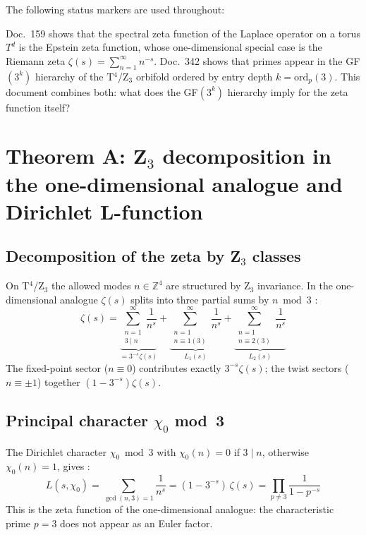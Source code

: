 The following status markers are used throughout:


Doc.~159 shows that the spectral zeta function of the Laplace operator on a torus
$T^d$ is the Epstein zeta function, whose one-dimensional special case is the
Riemann zeta $\zeta(s) = \sum_{n=1}^\infty n^{-s}$.
Doc.~342 shows that primes appear in the GF$(3^k)$ hierarchy of the T$^4$/Z$_3$
orbifold ordered by entry depth $k = \mathrm{ord}_p(3)$.
This document combines both: what does the GF$(3^k)$ hierarchy imply for the
zeta function itself?

\section{Theorem A: Z$_3$ decomposition in the one-dimensional analogue and Dirichlet L-function}

\subsection{Decomposition of the zeta by Z$_3$ classes}

On T$^4$/Z$_3$ the allowed modes $n \in \mathbb{Z}^4$ are structured by
Z$_3$ invariance. In the one-dimensional analogue $\zeta(s)$ splits into
three partial sums by $n \bmod 3$ \BM:
\begin{equation}
  \zeta(s) = \underbrace{\sum_{\substack{n=1\\3\mid n}}^\infty \frac{1}{n^s}}_{= 3^{-s}\zeta(s)}
  + \underbrace{\sum_{\substack{n=1\\n\equiv 1(3)}}^\infty \frac{1}{n^s}}_{L_1(s)}
  + \underbrace{\sum_{\substack{n=1\\n\equiv 2(3)}}^\infty \frac{1}{n^s}}_{L_2(s)}
\end{equation}
The fixed-point sector ($n \equiv 0$) contributes exactly $3^{-s}\zeta(s)$;
the twist sectors ($n \equiv \pm 1$) together $(1 - 3^{-s})\zeta(s)$.

\subsection{Principal character $\chi_0$ mod~3}

The Dirichlet character $\chi_0 \bmod 3$ with $\chi_0(n) = 0$ if $3 \mid n$,
otherwise $\chi_0(n) = 1$, gives \BM:
\begin{equation}
  L(s,\chi_0) = \sum_{\gcd(n,3)=1} \frac{1}{n^s}
  = (1 - 3^{-s})\,\zeta(s)
  = \prod_{p \neq 3} \frac{1}{1-p^{-s}}
\end{equation}
This is the zeta function of the one-dimensional analogue: the
characteristic prime $p=3$ does not appear as an Euler factor.

